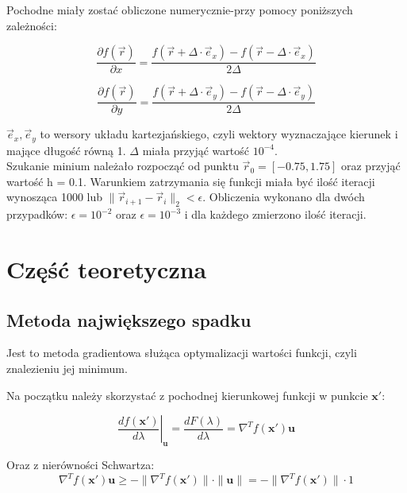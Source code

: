 \documentclass{article}
\begin{document}
\noindent 
Pochodne miały zostać obliczone numerycznie-przy pomocy poniższych zależności:

\begin{equation*}
\frac{\partial f(\vec{r})}{\partial x} = \frac{f(\vec{r} + \Delta \cdot \vec{e}_x) - f(\vec{r} - \Delta \cdot \vec{e}_x)}{2\Delta}
\end{equation*}

\begin{equation*}
\frac{\partial f(\vec{r})}{\partial y} = \frac{f(\vec{r} + \Delta \cdot \vec{e}_y) - f(\vec{r} - \Delta \cdot \vec{e}_y)}{2\Delta}
\end{equation*}

\noindent
$\vec e_x, \vec e_y$ to wersory układu kartezjańskiego, czyli wektory wyznaczające kierunek i mające długość równą 1. $\Delta$ miała przyjąć wartość $10^{-4}$. \\
Szukanie minium należało rozpocząć od punktu $\vec r_0 = [-0.75, 1.75]$ oraz przyjąć wartość h = 0.1. Warunkiem zatrzymania się funkcji miała być ilość iteracji wynosząca 1000 lub $\|\vec{r}_{i+1} - \vec{r}_i\|_2 < \epsilon$. Obliczenia wykonano dla dwóch przypadków: $\epsilon = 10^{-2}$ oraz $\epsilon = 10^{-3}$ i dla każdego zmierzono ilość iteracji. 

\section{Część teoretyczna}

\subsection{Metoda największego spadku}

Jest to metoda gradientowa służąca optymalizacji wartości funkcji, czyli znalezieniu jej minimum. 

\noindent
Na początku należy skorzystać z pochodnej kierunkowej funkcji w punkcie $\mathbf{x'}$: 

\begin{equation*}
\left.\frac{df(\mathbf{x'})}{d\lambda}\right|_{\mathbf{u}} = \frac{dF(\lambda)}{d\lambda} = \nabla^T f(\mathbf{x'}) \mathbf{u}
\end{equation*}

\noindent
Oraz z nierówności Schwartza:
\begin{equation*}
\nabla^T f(\mathbf{x'}) \mathbf{u} \geq -\|\nabla^T f(\mathbf{x'})\| \cdot \|\mathbf{u}\| = -\|\nabla^T f(\mathbf{x'})\| \cdot 1
\end{equation*}
\end{document}
